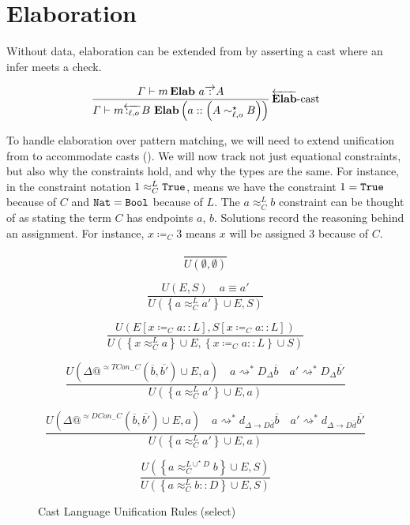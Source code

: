 \section{Elaboration}
Without data, elaboration can be extended from  by asserting a cast where an infer meets a check.

\[
\frac{\varGamma\vdash m\,\textbf{Elab}\ a\overrightarrow{\,:\,}A}{\varGamma\vdash m\overleftarrow{\,:_{\ell,o}\,}B\ \textbf{Elab}\left(a::\left(A\sim_{\ell,o}^{\star}B\right)\right)}
\rulename{\overleftarrow{\textbf{Elab}}-cast}
\]


To handle elaboration over pattern matching, we will need to extend unification from  to accommodate casts ().
We will now track not just equational constraints, but also why the constraints hold, and why the types are the same.
For instance, in the constraint notation $1 \approx_{C}^{L} \mathtt{True}{}$, means we have the constraint $1 = \mathtt{True}{}$ because of $C$ and $\mathtt{Nat}{} = \mathtt{Bool}{}$ because of $L$.
The $a \approx_{C}^{L} b$ constraint can be thought of as stating the term $C$ has endpoints $a$, $b$.
Solutions record the reasoning behind an assignment.
For instance, $x\coloneqq_{C} 3$ means $x$ will be assigned $3$ because of $C$.

\begin{figure}
\[
\frac{\,}{U\left(\emptyset,\emptyset\right)}
\]

\[
\frac{
  U\left(E,S\right)\quad a\equiv a'
}{
  U\left(\left\{ a \approx_{C}^{L} a' \right\} \cup E,S\right)
}
\]

\[
\frac{
  U\left(E\left[x\coloneqq_{C} a :: L\right],S\left[x\coloneqq_{C} a :: L\right]\right)
}{
  U\left(\left\{ x \approx_{C}^{L} a\right\} \cup E,\left\{x\coloneqq_{C} a :: L\right\} \cup S \right) 
}
\]

\[
\frac{
  U\left(\Delta @^{\approx TCon_{-}C}( \overline{b},\overline{b'} ) \cup E,a\right)\quad
  a\rightsquigarrow^* D_{\Delta}\overline{b}
  \quad   a' \rightsquigarrow^* D_{\Delta}\overline{b'}
}{U\left(\left\{ a \approx_{C}^{L} a'\right\} \cup E,a\right)}
\]

\[
\frac{
  U\left(\Delta @^{\approx DCon_{-}C}( \overline{b},\overline{b'} ) \cup E,a\right)\quad
  a\rightsquigarrow^* d_{\Delta\rightarrow D\overline{d}}\overline{b}
  \quad   a' \rightsquigarrow^* d_{\Delta\rightarrow D\overline{d}}\overline{b'}
}{U\left(\left\{ a \approx_{C}^{L} a'\right\} \cup E,a\right)}
\]

\[
\frac{
  U\left( \left\{ a \approx_{C}^{L\cup^{\star}D} b \right\}\cup E, S \right)
}{
  U\left(\left\{ a \approx_{C}^{L} b::D \right\} \cup E, S \right) 
}
\]

\caption{Cast Language Unification Rules (select)}
\label{fig:cast-data-unification}
\end{figure}

